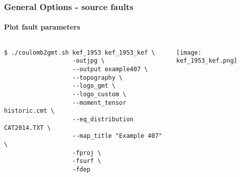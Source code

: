 \begin{frame}[t,fragile]
  \frametitle{General Options - source faults}
  \framesubtitle{Plot fault parameters}
  \label{fr4:hist_pics}
\begin{columns}[t]
  \begin{column}{.5\textwidth}
\begin{scriptsize}
\begin{verbatim}
$ ./coulomb2gmt.sh kef_1953 kef_1953_kef \
                   -outjpg \ 
                   --output example407 \
                   --topography \
                   --logo_gmt \
                   --logo_custom \
                   --moment_tensor historic.cmt \
                   --eq_distribution CAT2014.TXT \
                   --map_title "Example 407" \
                   -fproj \
                   -fsurf \
                   -fdep
\end{verbatim}
\end{scriptsize}

  \end{column}
  \begin{column}{.5\textwidth}

\centering
  \texttt{[image: kef\_1953\_kef.png]}
  \end{column}
\end{columns}

\end{frame}
\note{}

























